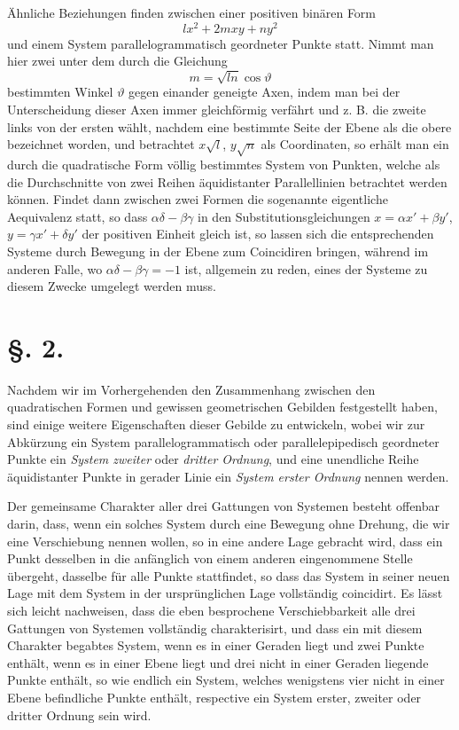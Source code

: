 \documentclass[11pt]{article}
\begin{document}
Ähnliche Beziehungen finden zwischen einer positiven binären Form
\[
 lx^2+2mxy+ny^2
\]
und einem System parallelogrammatisch geordneter Punkte statt. Nimmt man hier zwei unter dem durch die Gleichung
\[
 m=\sqrt{ln}\cos\vartheta
\]
bestimmten Winkel $\vartheta$ gegen einander geneigte Axen, indem man bei der Unterscheidung dieser Axen immer gleichförmig verfährt und z. B. die zweite links von der ersten wählt, nachdem eine bestimmte Seite der Ebene als die obere bezeichnet worden, und betrachtet $x\sqrt l$, $y\sqrt n$ als Coordinaten, so erhält man ein durch die quadratische Form völlig bestimmtes System von Punkten, welche als die Durchschnitte von zwei Reihen äquidistanter Parallellinien betrachtet werden können. Findet dann zwischen zwei Formen die sogenannte eigentliche Aequivalenz statt, so dass $\alpha\delta-\beta\gamma$ in den Substitutionsgleichungen $x=\alpha x'+\beta y'$, $y=\gamma x'+\delta y'$ der positiven Einheit gleich ist, so lassen sich die entsprechenden Systeme durch Bewegung in der Ebene zum Coincidiren bringen, während im anderen Falle, wo $\alpha\delta-\beta\gamma=-1$ ist, allgemein zu reden, eines der Systeme zu diesem Zwecke umgelegt werden muss.

\section*{§. 2.}

Nachdem wir im Vorhergehenden den Zusammenhang zwischen den quadratischen Formen und gewissen geometrischen Gebilden festgestellt haben, sind einige weitere Eigenschaften dieser Gebilde zu entwickeln, wobei wir zur Abkürzung ein System parallelogrammatisch oder parallelepipedisch geordneter Punkte ein \emph{System zweiter} oder \emph{dritter Ordnung}, und eine unendliche Reihe äquidistanter Punkte in gerader Linie ein \emph{System erster Ordnung} nennen werden.

Der gemeinsame Charakter aller drei Gattungen von Systemen besteht offenbar darin, dass, wenn ein solches System durch eine Bewegung ohne Drehung, die wir eine Verschiebung nennen wollen, so in eine andere Lage gebracht wird, dass ein Punkt desselben in die anfänglich von einem anderen eingenommene Stelle übergeht, dasselbe für alle Punkte stattfindet, so dass das System in seiner neuen Lage mit dem System in der ursprünglichen Lage vollständig coincidirt. Es lässt sich leicht nachweisen, dass die eben besprochene Verschiebbarkeit alle drei Gattungen von Systemen vollständig charakterisirt, und dass ein mit diesem Charakter begabtes System, wenn es in einer Geraden liegt und zwei Punkte enthält, wenn es in einer Ebene liegt und drei nicht in einer Geraden liegende Punkte enthält, so wie endlich ein System, welches wenigstens vier nicht in einer Ebene befindliche Punkte enthält, respective ein System erster, zweiter oder dritter Ordnung sein wird.
\end{document}
